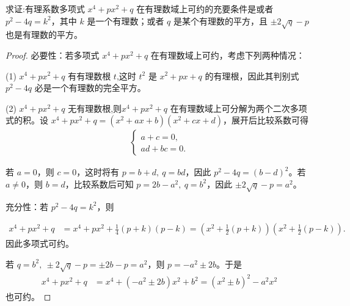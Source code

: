 \documentclass[../../main.tex]{subfiles}%
\begin{document}
\begin{example}
求证:有理系数多项式 $x^4 + px^2 + q$ 在有理数域上可约的充要条件是或者 $p^2 - 4q = k^2$，其中 $k$ 是一个有理数；或者 $q$ 是某个有理数的平方，且 $\pm 2\sqrt{q} - p$ 也是有理数的平方。
\end{example}
\begin{proof}

必要性：若多项式 $x^4 + px^2 + q$ 在有理数域上可约，考虑下列两种情况：

(1) $x^4 + px^2 + q$ 有有理数根 $t$,这时 $t^2$ 是 $x^2 + px + q$ 的有理根，因此其判别式 $p^2 - 4q$ 必是一个有理数的完全平方。

(2) $x^4 + px^2 + q$ 无有理数根,则$x^4 + px^2 + q$ 在有理数域上可分解为两个二次多项式的积。设 $x^4 + px^2 + q = (x^2 + ax + b)(x^2 + cx + d)$，展开后比较系数可得
\begin{align*}
\begin{cases}
a + c = 0, \\
ad + bc = 0.
\end{cases}
\end{align*}

若 $a = 0$，则 $c = 0$，这时将有 $p = b + d, \ q = bd$，因此 $p^2 - 4q = (b - d)^2$。若 $a \neq 0$，则 $b = d$，比较系数后可知 $p = 2b - a^2, \ q = b^2$，因此 $\pm 2\sqrt{q} - p = a^2$。

充分性：若 $p^2 - 4q = k^2$，则

\begin{align*}
x^4 + px^2 + q &= x^4 + px^2 + \frac{1}{4}(p + k)(p - k) = \left(x^2 + \frac{1}{2}(p + k)\right)\left(x^2 + \frac{1}{2}(p - k)\right).
\end{align*}
因此多项式可约。

若 $q = b^2, \ \pm 2\sqrt{q} - p = \pm 2b - p = a^2$，则 $p = -a^2 \pm 2b$。于是
\begin{align*}
x^4 + px^2 + q &= x^4 + (-a^2 \pm 2b)x^2 + b^2 = (x^2 \pm b)^2 - a^2x^2
\end{align*}
也可约。

\end{proof}
\end{document}
